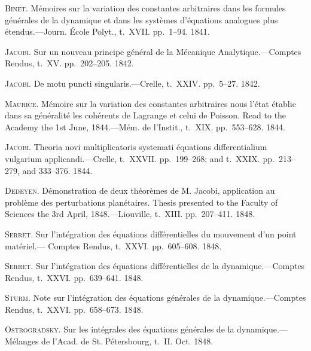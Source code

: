 \documentclass[12pt,a4paper]{article}
\theoremstyle{definition}
\begin{document}
\noindent\textsc{Binet}. M\'emoires sur la variation des constantes arbitraires dans les formules g\'en\'erales
de la dynamique et dans les syst\`emes d'\'equations analogues plus \'etendus.---Journ.
\'Ecole Polyt., t.~XVII. pp.~1--94. 1841.

\smallskip

\noindent\textsc{Jacobi}. Sur un nouveau principe g\'en\'eral de la M\'ecanique Analytique.---Comptes
Rendus, t.~XV. pp.~202--205. 1842.

\smallskip

\noindent\textsc{Jacobi}. De motu puncti singularis.---Crelle, t.~XXIV. pp.~5--27. 1842.

\smallskip

\noindent\textsc{Maurice}. M\'emoire sur la variation des constantes arbitraires nous l'\'etat \'etablie dans
sa g\'en\'eralit\'e les coh\'erents de Lagrange et celui de Poisson. Read to the Academy
the 1st June, 1844.---M\'em. de l'Instit., t.~XIX. pp.~553--628. 1844.

\smallskip

\noindent\textsc{Jacobi}. Theoria novi multiplicatoris systemati \'equations differentialium vulgarium
applicandi.---Crelle, t.~XXVII. pp.~199--268; and t.~XXIX. pp.~213--279, and 333--376.
1844.

\smallskip

\noindent\textsc{Dedeyen}. D\'emonstration de deux th\'eor\`emes de M. Jacobi, application au probl\`eme des
perturbations plan\'etaires. Thesis presented to the Faculty of Sciences the 3rd
April, 1848.---Liouville, t.~XIII. pp.~207--411. 1848.

\smallskip

\noindent\textsc{Serret}. Sur l'int\'egration des \'equations diff\'erentielles du mouvement d'un point mat\'eriel.---
Comptes Rendus, t.~XXVI. pp.~605--608. 1848.

\smallskip

\noindent\textsc{Serret}. Sur l'int\'egration des \'equations diff\'erentielles de la dynamique.---Comptes Rendus,
t.~XXVI. pp.~639--641. 1848.

\smallskip

\noindent\textsc{Sturm}. Note sur l'int\'egration des \'equations g\'en\'erales de la dynamique.---Comptes
Rendus, t.~XXVI. pp.~658--673. 1848.

\smallskip

\noindent\textsc{Ostrogradsky}. Sur les int\'egrales des \'equations g\'en\'erales de la dynamique.---M\'elanges
de l'Acad. de St. P\'etersbourg, t.~II. Oct. 1848.
\end{document}
